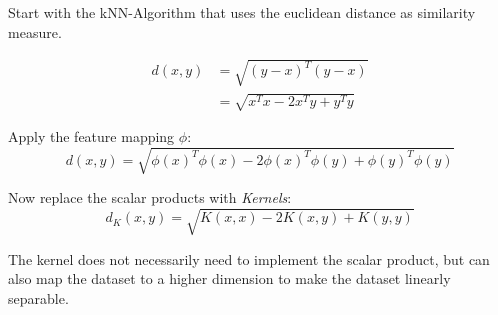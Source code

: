 Start with the kNN-Algorithm that uses the euclidean distance as similarity measure.

\begin{align*}
d(x,y) &= \sqrt{(y-x)^T(y-x)} \\
       &= \sqrt{x^Tx - 2x^Ty + y^Ty}
\end{align*}

Apply the feature mapping $\phi$:
\[ d(x,y) = \sqrt{\phi(x)^T\phi(x) - 2\phi(x)^T\phi(y) + \phi(y)^T\phi(y)} \]

Now replace the scalar products with \emph{Kernels}:
\[ d_K(x,y) = \sqrt{K(x,x) - 2K(x,y) + K(y,y)} \]

The kernel does not necessarily need to implement the scalar product, but can also map the dataset to a higher dimension to make the dataset linearly separable.

